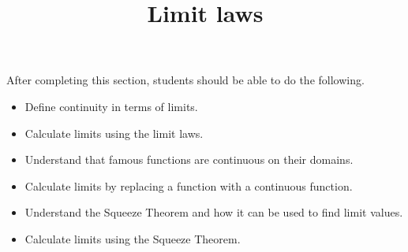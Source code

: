 \documentclass{ximera}
\title{Limit laws}
\begin{document}
\begin{abstract}
\end{abstract}

\maketitle

\begin{sectionOutcomes}
After completing this section, students should be able to do the following.

\begin{itemize}
\item Define continuity in terms of limits.
\item Calculate limits using the limit laws.
\item Understand that famous functions are continuous on their domains. 
\item Calculate limits by replacing a function with a continuous
  function.
\item Understand the Squeeze Theorem and how it can be used to find limit values.
\item Calculate limits using the Squeeze Theorem.
\end{itemize}
\end{sectionOutcomes}
\end{document}
